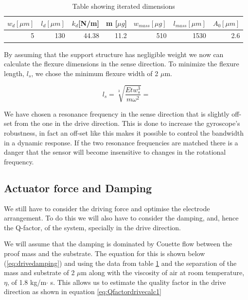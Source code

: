 \documentclass[12pt,a4paper,titlepage]{article}
\begin{document}
\begin{spacing}{1.1}
\begin{table}[htbp]
\caption{Table showing iterated dimensions}
\centering
\begin{tabular}{lllllll}
\toprule
$w_d [\mu m]$ & $l_d [\mu m]$ & $k_d$[N/m] & m [$\mu g$] & $w_{mass} [\mu g]$ & $l_{mass} [\mu m]$ & $A_0 [\mu m]$ \\ \midrule
\multicolumn{1}{r}{5} & \multicolumn{1}{r}{130} & \multicolumn{1}{r}{44.38} & \multicolumn{1}{r}{11.2} & \multicolumn{1}{r}{510} & \multicolumn{1}{r}{1530} & \multicolumn{1}{r}{2.6} \\ \bottomrule
\end{tabular}
\label{tab:1stiteration}
\end{table}

By assuming that the support structure has negligible weight we now can calculate the flexure dimensions in the sense direction. To minimize the flexure length, $l_s$, we chose the minimum flexure width of 2 $\mu$m.

\begin{equation}
l_s = \sqrt[3]{\dfrac{E t w_s^3}{m \omega^2} } =
\label{eq:senselength}
\end{equation}

We have chosen a resonance frequency in the sense direction that is slightly off-set from the one in the drive direction. This is done to increase the gyroscope's robustness, in fact an off-set like this makes it possible to control the bandwidth in a dynamic response. If the two resonance frequencies are matched there is a danger that the sensor will become insensitive to changes in the rotational frequency.

\subsection{Actuator force and Damping}

We still have to consider the driving force and optimise the electrode arrangement. To do this we will also have to consider the damping, and, hence the Q-factor, of the system, specially in the drive direction.

We will assume that the damping is dominated by Couette flow between the proof mass and the substrate. The equation for this is shown below (\ref{eq:drivedamping}) and using the data from table \ref{tab:1stiteration} and the separation of the mass and substrate of 2 $\mu$m along with the viscosity of air at room temperature, $\eta$, of 1.8 kg/m$\cdot$ s. This allows us to estimate the quality factor in the drive direction as shown in equation \ref{eq:Qfactordrivecalc1}


\end{spacing}
\end{document}
